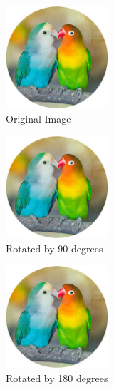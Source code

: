 \documentclass{article}
\begin{document}
\listoffigures
\pagebreak

    \begin{figure}[h]
        \centering
        \includegraphics[width=1.5in]{parrot.jpeg}
        \caption{Original Image}
    \end{figure}
      
    \begin{figure}[h]
        \centering
        \includegraphics[width=1.5in, angle=90]{parrot.jpeg}
        \caption{Rotated by 90 degrees}
    \end{figure}

    \begin{figure}[h]
        \centering
        \includegraphics[width=1.5in, angle=180]{parrot.jpeg}
        \caption{Rotated by 180 degrees}
    \end{figure}

    \pagebreak
\end{document}
